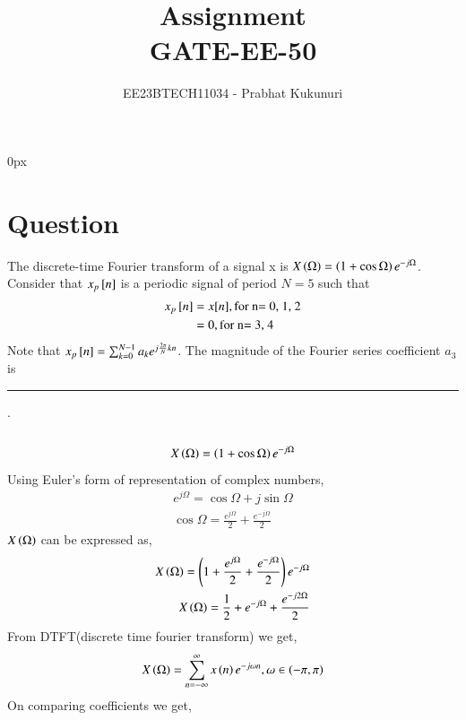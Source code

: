 \documentclass[journal,12pt,twocolumn]{IEEEtran}
\theoremstyle{remark}
\begin{document}
\parindent 0px


\vspace{3cm}

\title{Assignment\\[1ex]GATE-EE-50}
\author{EE23BTECH11034 - Prabhat Kukunuri$^{}$%
}
\maketitle
\newpage
\bigskip

\renewcommand{\thefigure}{\theenumi}
\renewcommand{\thetable}{\theenumi}
\section*{Question}
The discrete-time Fourier transform of a signal x is $X\left(\Omega\right)=\left(1+\cos{\Omega}\right)e^{-j\Omega}$. Consider that $x_{p}{}\left[n\right]$ is a periodic signal of period $N=5$ such that
\begin{align}
    x_p{}\left[n\right]&=x[n],\text{for n= 0, 1, 2}\\
    &=0,\text{for n= 3, 4}
\end{align}
Note that $x_p{}\left[n\right]=\sum_{k=0}^{N-1}a_{k}e^{j\frac{2\pi}{N}kn}$. The magnitude of the Fourier series coefficient $a_3$ is \rule{3cm}{0.15mm} .\\
\solution\\
\begin{align}
    X\left(\Omega\right)=\left(1+\cos{\Omega}\right)e^{-j\Omega}
\end{align}
Using Euler's form of representation of complex numbers,
\begin{align}
    e^{j\Omega}=\cos{\Omega}+j\sin{\Omega}\\
    \cos{\Omega}=\frac{e^{j\Omega}}{2}+\frac{e^{-j\Omega}}{2}
\end{align}
$X\left(\Omega\right)$ can be expressed as,
\begin{align}
    X\left(\Omega\right)=\left(1+\frac{e^{j\Omega}}{2}+\frac{e^{-j\Omega}}{2}\right)e^{-j\Omega}\\
    X\left(\Omega\right)=\frac{1}{2}+e^{-j\Omega}+\frac{e^{-j2\Omega}}{2}
\end{align}
From DTFT(discrete time fourier transform) we get,
\begin{align}
    X\left(\Omega\right)=\sum^{\infty}_{n=-\infty}x\left(n\right)e^{-j\omega n},   \omega \in \left(-\pi,\pi\right)
\end{align}
On comparing coefficients we get,
\end{document}
